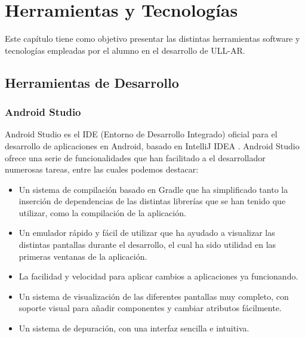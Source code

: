 %
%
%


\cleardoublepage
\chapter{Herramientas y Tecnologías} \label{chap:Tecnologias} 

Este capítulo tiene como objetivo presentar las distintas herramientas software y tecnologías empleadas por el alumno en el desarrollo de ULL-AR.

\section{Herramientas de Desarrollo}

\subsection{Android Studio}

Android Studio \cite{URL::AndroidStudio} es el IDE  \cite{URL::IDE} (Entorno de Desarrollo Integrado) oficial para el desarrollo de aplicaciones en Android, basado en IntelliJ IDEA \cite{URL::IntelliJIDEA}. Android Studio ofrece una serie de funcionalidades que han facilitado a el desarrollador numerosas tareas, entre las cuales podemos destacar:

\begin{itemize}
\item Un sistema de compilación basado en Gradle \cite{URL::Gradle} que ha simplificado tanto la inserción de dependencias de las distintas librerías que se han tenido que utilizar, como la compilación de la aplicación.
\item Un emulador rápido y fácil de utilizar que ha ayudado a visualizar las distintas pantallas durante el desarrollo, el cual ha sido utilidad en las primeras ventanas de la aplicación.
\item La facilidad y velocidad para aplicar cambios a aplicaciones ya funcionando. 
\item Un sistema de visualización de las diferentes pantallas muy completo, con soporte visual para añadir componentes y cambiar atributos fácilmente.
\item Un sistema de depuración, con una interfaz sencilla e intuitiva.
\end{itemize} 


